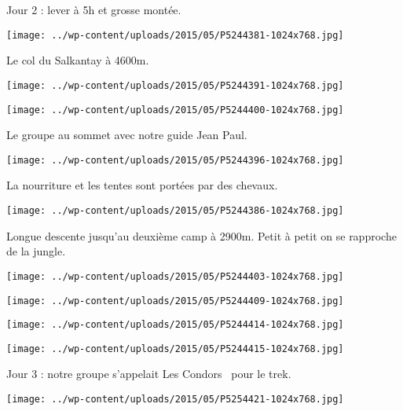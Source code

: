 Jour 2 : lever à 5h et grosse montée. 
\begin{center} \texttt{[image: ../wp-content/uploads/2015/05/P5244381-1024x768.jpg]} \end{center}
\pagebreak

Le col du Salkantay à 4600m.
\begin{center} \texttt{[image: ../wp-content/uploads/2015/05/P5244391-1024x768.jpg]} \end{center}
\begin{center} \texttt{[image: ../wp-content/uploads/2015/05/P5244400-1024x768.jpg]} \end{center}
\pagebreak

Le groupe au sommet avec notre guide Jean Paul. 
\begin{center} \texttt{[image: ../wp-content/uploads/2015/05/P5244396-1024x768.jpg]} \end{center}

La nourriture et les tentes sont portées par des chevaux. 
\begin{center} \texttt{[image: ../wp-content/uploads/2015/05/P5244386-1024x768.jpg]} \end{center}
\pagebreak

Longue descente jusqu'au deuxième camp à 2900m. Petit à petit on se rapproche de la jungle. 
\begin{center} \texttt{[image: ../wp-content/uploads/2015/05/P5244403-1024x768.jpg]} \end{center}
\begin{center} \texttt{[image: ../wp-content/uploads/2015/05/P5244409-1024x768.jpg]} \end{center}

\begin{center} \texttt{[image: ../wp-content/uploads/2015/05/P5244414-1024x768.jpg]} \end{center}
\begin{center} \texttt{[image: ../wp-content/uploads/2015/05/P5244415-1024x768.jpg]} \end{center}
\pagebreak

Jour 3 : notre groupe s'appelait \og Les Condors \fg\ pour le trek. 
\begin{center} \texttt{[image: ../wp-content/uploads/2015/05/P5254421-1024x768.jpg]} \end{center}

